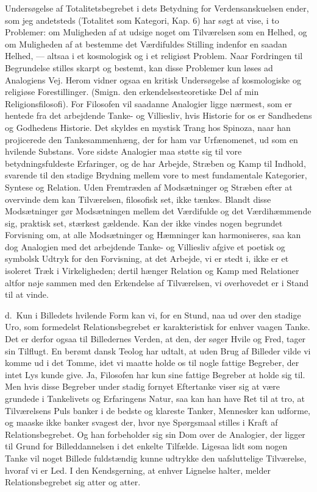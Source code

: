 \documentclass[12pt]{article}
\newcommand{\opage}[1]{\marginnote{\footnotesize\textit{[#1]}}}
\begin{document}
Undersøgelse af Totalitetsbegrebet i dets Betydning for Verdensanskuelsen
ender, som jeg andetsteds (Totalitet som Kategori, Kap. 6) har søgt at
vise, i to Problemer: om Muligheden af at udsige noget om Tilværelsen som
en Helhed, og om Muligheden af at bestemme det Værdifuldes Stilling
indenfor en saadan Helhed, --- altsaa i et kosmologisk og i et religiøst
Problem. Naar Fordringen til Begrundelse stilles skarpt og bestemt, kan
disse Problemer kun løses ad Analogiens Vej. Herom vidner ogsaa en kritisk
Undersøgelse af kosmologiske og religiøse Forestillinger. (Smign. den
erkendelsesteoretiske Del af min Religionsfilosofi). For Filosofen vil
saadanne Analogier ligge nærmest, som er hentede fra det arbejdende Tanke-
og Villiesliv, hvis Historie for os er Sandhedens og Godhedens Historie.
Det skyldes en mystisk Trang hos Spinoza, naar han projicerede den
Tankesammenhæng, der for ham var Urfænomenet, ud som en hvilende Substans.
Vore sidste Analogier maa støtte sig til vore betydningsfuldeste
Erfaringer, og de har Arbejde, Stræben og Kamp til Indhold, svarende til
den stadige Brydning mellem vore to mest fundamentale Kategorier, Syntese
og Relation. Uden Fremtræden af Modsætninger og Stræben efter at overvinde
dem kan Tilværelsen, filosofisk set, ikke tænkes. Blandt disse Modsætninger
gør Modsætningen mellem det Værdifulde og det Værdihæmmende sig, praktisk
set, stærkest gældende.
\opage{107} Kan der ikke vindes nogen begrundet Forvisning om, at alle Modsætninger og
Hæmninger kan harmoniseres, saa kan dog Analogien med det arbejdende Tanke-
og Villiesliv afgive et poetisk og symbolsk Udtryk for den Forvisning, at
det Arbejde, vi er stedt i, ikke er et isoleret Træk i Virkeligheden;
dertil hænger Relation og Kamp med Relationer altfor nøje sammen med den
Erkendelse af Tilværelsen, vi overhovedet er i Stand til at vinde.

d.~Kun i Billedets hvilende Form kan vi, for en Stund, naa ud over den
stadige Uro, som formedelst Relationsbegrebet er karakteristisk for enhver
vaagen Tanke. Det er derfor ogsaa til Billedernes Verden, at den, der søger
Hvile og Fred, tager sin Tilflugt. En berømt dansk Teolog har udtalt, at
uden Brug af Billeder vilde vi komme ud i det Tomme, idet vi maatte holde
os til nogle fattige Begreber, der intet Lys kunde give. Ja, Filosofen har
kun sine fattige Begreber at holde sig til. Men hvis disse Begreber under
stadig fornyet Eftertanke viser sig at være grundede i Tankelivets og
Erfaringens Natur, saa kan han have Ret til at tro, at Tilværelsens Puls
banker i de bedste og klareste Tanker, Mennesker kan udforme, og maaske
ikke banker svagest der, hvor nye Spørgsmaal stilles i Kraft af
Relationsbegrebet. Og han forbeholder sig sin Dom over de Analogier, der
ligger til Grund for Billeddannelsen i det enkelte Tilfælde. Ligesaa lidt
som nogen Tanke vil noget Billede fuldstændig kunne udtrykke den
uafsluttelige Tilværelse, hvoraf vi er Led. I den Kendsgerning, at enhver
Lignelse halter, melder Relationsbegrebet sig atter og atter.
\end{document}
